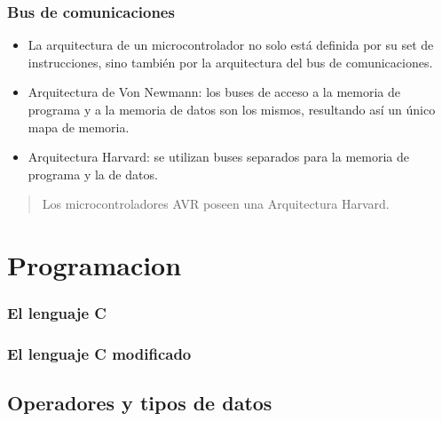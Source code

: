 \documentclass{beamer}
\begin{document}
\begin{frame}
\frametitle{Bus de comunicaciones}
\begin{itemize}
\item La arquitectura de un microcontrolador no solo está definida por su set de instrucciones, sino también por la arquitectura del bus de comunicaciones.
\item Arquitectura de Von Newmann: los buses de acceso a la memoria de programa y a la memoria de datos son los mismos, resultando así un único mapa de memoria.
\item Arquitectura Harvard: se utilizan buses separados para la memoria de programa y la de datos.
\end{itemize}
\begin{quotation}
Los microcontroladores AVR poseen una Arquitectura Harvard.
\end{quotation}
\end{frame}

\section{Programacion}

\begin{frame}
\frametitle{El lenguaje C}

\end{frame}

\begin{frame}
\frametitle{El lenguaje C modificado}

\end{frame}

\subsection{Operadores y tipos de datos}
\end{document}
